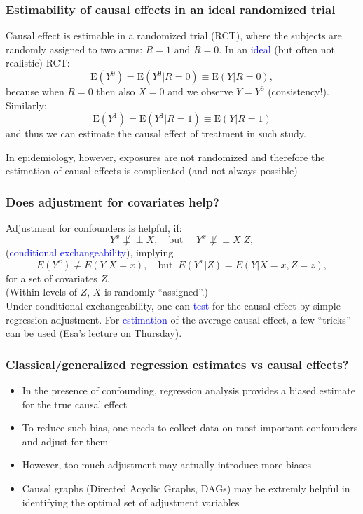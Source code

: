 \documentclass[10pt,dvipsnames,t,handout%
,aspectratio=169%
]{beamer}%
\newcommand{\E}{\mathrm{E}}
\newcommand{\indep}{\perp\!\!\!\!\perp}
\newcommand{\sini}[1]{\textcolor{Blue}{#1}}
\newcommand{\puna}[1]{\textcolor{BrickRed}{#1}}
\begin{document}
\begin{frame}
	\frametitle{Estimability of causal effects in an ideal randomized trial}
	Causal effect is estimable in a \puna{randomized trial (RCT)}, where the subjects are randomly assigned to two arms: $R=1$ and $R=0$. In an \sini{ideal} (but often not realistic) RCT: 
		$$\E(Y^0) = \E(Y^0|R=0) \equiv \E(Y|R=0),$$
	because when $R=0$ then also $X=0$ and we observe $Y=Y^0$ (consistency!). \\  
	Similarly: 
	$$\E(Y^1) = \E(Y^1|R=1) \equiv \E(Y|R=1)$$ 
	and thus we can estimate the causal effect of treatment in such study.
	\begin{block}{}	
		In epidemiology, however, exposures are not randomized and therefore the estimation of causal effects is complicated (and not always possible).
	\end{block}
\end{frame}


\begin{frame}
	\frametitle{Does adjustment for covariates help?}
	Adjustment for confounders is helpful, if:
	$$Y^x \not\indep X, \quad  \text{but } \quad Y^x \not\indep X | Z,$$ (\sini{conditional exchangeability}), implying 
	$$E(Y^x) \ne E(Y|X=x), \quad \text{but } \
	E(Y^x|Z) = E(Y|X=x, Z=z),$$
	for a set of covariates $Z$. \\
	(Within levels of $Z$, $X$ is randomly ``assigned''.)\\[5mm]
	Under conditional exchangeability, one can \sini{test} for the causal effect by simple regression adjustment. For \sini{estimation} of the average causal effect, a few ``tricks'' can be used (Esa's lecture on Thursday). 
\end{frame}




\begin{frame}
 \frametitle{Classical/generalized regression estimates vs  causal effects?}
 \begin{itemize}
 \item In the presence of confounding, regression analysis provides a biased estimate for the true causal effect
\item To reduce such bias, one needs to collect data on most important confounders and adjust for them
\item However, too much adjustment may actually introduce more biases   
\item Causal graphs (Directed Acyclic Graphs, DAGs) may be extremly helpful in identifying the optimal set of adjustment variables
\end{itemize}
 \end{frame}
\end{document}
